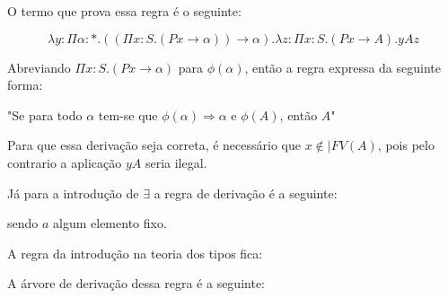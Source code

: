 \documentclass[../main.tex]{subfiles}
\begin{document}
\begin{prooftree}
    
\end{prooftree}

O termo que prova essa regra é o seguinte:

$$\lambda y : \Pi \alpha : \ast . ((\Pi x : S . (Px \to \alpha)) \to \alpha) . \lambda z : \Pi x : S . (Px \to A) . yAz$$

Abreviando $\Pi x : S . (Px \to \alpha)$ para $\phi (\alpha)$, então a regra expressa da seguinte forma: 

"Se para todo $\alpha$ tem-se que $\phi(\alpha) \Rightarrow \alpha$ e $\phi(A)$, então $A$"

Para que essa derivação seja correta, é necessário que $x \not\in |FV(A)$, pois pelo contrario a aplicação $yA$ seria ilegal.

Já para a introdução de $\exists$ a regra de derivação é a seguinte:

\begin{prooftree}

\end{prooftree}

sendo $a$ algum elemento fixo.

A regra da introdução na teoria dos tipos fica:

\begin{prooftree}

\end{prooftree}

A árvore de derivação dessa regra é a seguinte:
\end{document}
